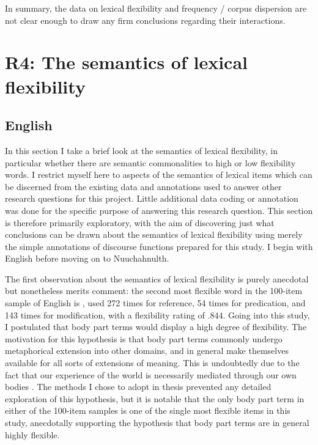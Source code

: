 In summary, the data on lexical flexibility and frequency / corpus dispersion are not clear enough to draw any firm conclusions regarding their interactions.

\section{R4: The semantics of lexical flexibility}
\label{sec:4.6}

\subsection{English}
\label{sec:4.6.1}

In this section I take a brief look at the semantics of lexical flexibility, in particular whether there are semantic commonalities to high or low flexibility words. I restrict myself here to aspects of the semantics of lexical items which can be discerned from the existing data and annotations used to answer other research questions for this project. Little additional data coding or annotation was done for the specific purpose of answering this research question. This section is therefore primarily exploratory, with the aim of discovering just what conclusions can be drawn about the semantics of lexical flexibility using merely the simple annotations of discourse functions prepared for this study. I begin with English before moving on to Nuuchahnulth.

The first observation about the semantics of lexical flexibility is purely anecdotal but nonetheless merits comment: the second most flexible word in the 100-item sample of English is , used 272 times for reference, 54 times for predication, and 143 times for modification, with a flexibility rating of $.844$. Going into this study, I postulated that body part terms would display a high degree of flexibility. The motivation for this hypothesis is that body part terms commonly undergo metaphorical extension into other domains, and in general make themselves available for all sorts of extensions of meaning. This is undoubtedly due to the fact that our experience of the world is necessarily mediated through our own bodies . The methods I chose to adopt in thesis prevented any detailed exploration of this hypothesis, but it is notable that the only body part term in either of the 100-item samples is one of the single most flexible items in this study, anecdotally supporting the hypothesis that body part terms are in general highly flexible.

